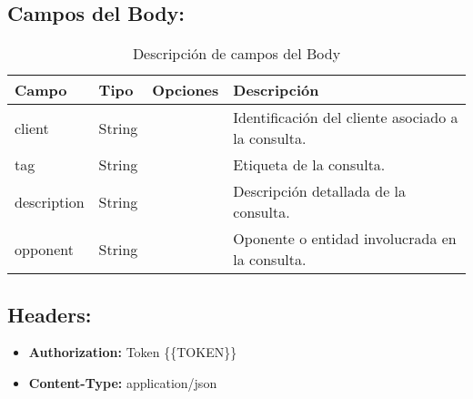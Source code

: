 \subsection*{Campos del Body:}

\begin{table}[H]
    \centering
    \begin{tabular}{|l|l|l|p{7cm}|}
        \hline
        \textbf{Campo} & \textbf{Tipo} & \textbf{Opciones} & \textbf{Descripción} \\ \hline
        client & String & & Identificación del cliente asociado a la consulta. \\ \hline
        tag & String & & Etiqueta de la consulta. \\ \hline
        description & String & & Descripción detallada de la consulta. \\ \hline
        opponent & String & & Oponente o entidad involucrada en la consulta. \\ \hline
    \end{tabular}
    \caption{Descripción de campos del Body}
    \label{tab:body-fields-consultation}
\end{table}

\subsection*{Headers:}

\begin{itemize}
    \item \textbf{Authorization:} Token \{\{TOKEN\}\}
    \item \textbf{Content-Type:} application/json
\end{itemize}
